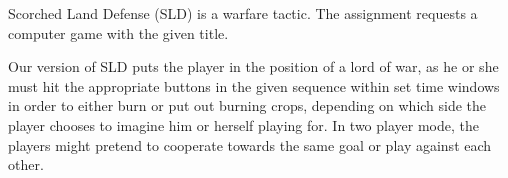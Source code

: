  \cite{lab-compendium}
Scorched Land Defense (SLD) is a warfare tactic. The assignment requests a computer game with the given title.

Our version of SLD puts the player in the position of a lord of war, as he or she must hit the appropriate buttons in the given sequence within set time windows in order to either burn or put out burning crops, depending on which side the player chooses to imagine him or herself playing for.
In two player mode, the players might pretend to cooperate towards the same goal or play against each other. 